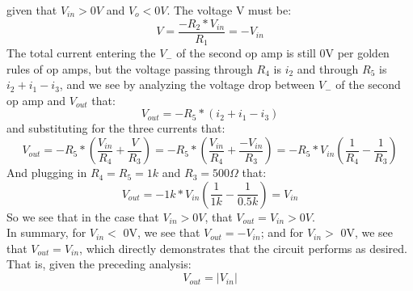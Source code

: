 \documentclass{article}
\begin{document}
    given that $V_{in} > 0V$ and $V_{o} < 0V$. The voltage V must be:
    \begin{equation}
        V = \frac{-R_2 * V_{in}}{R_1} = -V_{in}
    \end{equation}
    The total current entering the $V_-$ of the second op amp is still 0V per golden rules of op amps, but the voltage passing through $R_4$ is $i_2$ and through $R_5$ is $i_2 + i_1 - i_3$, and we see by analyzing the voltage drop between $V_-$ of the second op amp and $V_{out}$ that:
    \begin{equation}
        V_{out} = -R_5 * (i_2 + i_1 - i_3) 
    \end{equation}
    and substituting for the three currents that:
    \begin{equation}
        V_{out} = -R_5 * (\frac{V_{in}}{R_4} + \frac{V}{R_3}) = -R_5 * (\frac{V_{in}}{R_4} + \frac{-V_{in}}{R_3}) = -R_5 * V_{in} (\frac{1}{R_4} - \frac{1}{R_3})
    \end{equation}
    And plugging in $R_4 = R_5 = 1k$ and $R_3 = 500\Omega$ that:
    \begin{equation}
        V_{out} = -1k * V_{in} (\frac{1}{1k} - \frac{1}{0.5k}) = V_{in}
    \end{equation}
    So we see that in the case that $V_{in} > 0V$, that $V_{out} = V_{in} > 0V$.
    \\\indent In summary, for $V_{in} <$ 0V, we see that $V_{out} = -V_{in}$; and for $V_{in} >$ 0V, we see that $V_{out} = V_{in}$, which directly demonstrates that the circuit performs as desired. That is, given the preceding analysis:
    \begin{equation}
        V_{out} = |V_{in}|
    \end{equation}
    
\end{document}
